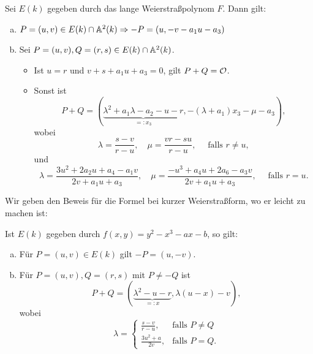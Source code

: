 \begin{satz}
\label{satz_13.13}
	Sei $E(k)$ gegeben durch das lange Weierstraßpolynom $F$. Dann gilt: \begin{enumerate}[(a)]
		\item $P = (u,v) \in E(k) \cap \mathbb{A}^2(k) \Rightarrow -P = (u,-v-a_1u-a_3)$
		\item Sei $P = (u,v), Q = (r,s) \in E(k) \cap \mathbb{A}^2(k)$. \begin{itemize}
			\item Ist $u = r$ und $v + s + a_1 u + a_3 = 0$, gilt $P + Q = \mathcal{O}$.
			\item Sonst ist 
			\[ P + Q = (\underbrace{\lambda^2 + a_1 \lambda - a_2 - u - r}_{=:x_3}, -(\lambda + a_1) x_3 - \mu - a_3), \] wobei
			\[ \lambda = \frac{s-v}{r-u}, \quad \mu = \frac{vr - su}{r-u}, \quad \text{ falls } r \neq u, \]
			und
			\[ \lambda = \frac{3u^2 + 2a_2 u +a_4 - a_1 v}{2v + a_1u + a_3}, \quad  \mu = \frac{-u^3 + a_4 u + 2a_6 - a_3v}{2v + a_1u + a_3}, \quad \text{ falls } r = u. \]
		\end{itemize}
	\end{enumerate}
\end{satz}

Wir geben den Beweis für die Formel bei kurzer Weierstraßform, wo er leicht zu machen ist:
\begin{satz}
\label{satz_13.14}
	Ist $E(k)$ gegeben durch $f(x,y) = y^2 - x^3 - ax - b$, so gilt:
	\begin{enumerate}[(a)]
		\item Für $P = (u,v) \in E(k)$ gilt $-P = (u,-v)$.
		\item Für $P = (u,v), Q = (r,s)$ mit $P \neq -Q$ ist
		\[ P + Q = (\underbrace{\lambda^2 - u - r}_{=:x}, \lambda(u-x) - v), \]
		wobei
		\[ \lambda = \begin{cases}
			\frac{s-v}{r-u}, & \text{falls } P \neq Q \\
			\frac{3u^2+a}{2v}, & \text{falls } P = Q.
		\end{cases} \]
	\end{enumerate}
\end{satz}

